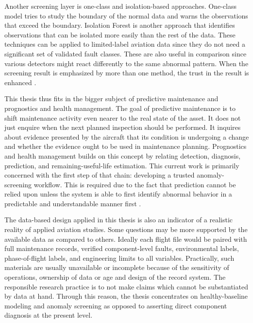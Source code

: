 \documentclass[12pt,a4paper]{report}
\begin{document}
	Another screening layer is one-class and isolation-based approaches. One-class model tries to study the boundary of the normal data and warns the observations that exceed the boundary. Isolation Forest is another approach that identifies observations that can be isolated more easily than the rest of the data. These techniques can be applied to limited-label aviation data since they do not need a significant set of validated fault classes. These are also useful in comparison since various detectors might react differently to the same abnormal pattern. When the screening result is emphasized by more than one method, the trust in the result is enhanced \cite{scholkopf2001ocsvm,liu2008iforest,liu2012iforest}.
	
	This thesis thus fits in the bigger subject of predictive maintenance and prognostics and health management. The goal of predictive maintenance is to shift maintenance activity even nearer to the real state of the asset. It does not just enquire when the next planned inspection should be performed. It inquires about evidence presented by the aircraft that its condition is undergoing a change and whether the evidence ought to be used in maintenance planning. Prognostics and health management builds on this concept by relating detection, diagnosis, prediction, and remaining-useful-life estimation. This current work is primarily concerned with the first step of that chain: developing a trusted anomaly-screening workflow. This is required due to the fact that prediction cannot be relied upon unless the system is able to first identify abnormal behavior in a predictable and understandable manner first \cite{peng2010prognostics,si2011rul,huang2024phm}.
	
	The data-based design applied in this thesis is also an indicator of a realistic reality of applied aviation studies. Some questions may be more supported by the available data as compared to others. Ideally each flight file would be paired with full maintenance records, verified component-level faults, environmental labels, phase-of-flight labels, and engineering limits to all variables. Practically, such materials are usually unavailable or incomplete because of the sensitivity of operations, ownership of data or age and design of the record system. The responsible research practice is to not make claims which cannot be substantiated by data at hand. Through this reason, the thesis concentrates on healthy-baseline modeling and anomaly screening as opposed to asserting direct component diagnosis at the present level.
	
\end{document}
